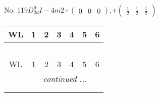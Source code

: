 \documentclass[fleqn,9pt,landscape]{jsarticle}
\begin{document}
\newpage
No. 119\quad$D_{2d}^{9}$\quad$I-4m2$\quad[ tetragonal ]\quad$+\begin{pmatrix} 0 & 0 & 0 \end{pmatrix}$,\quad $+\begin{pmatrix} \frac{1}{2} & \frac{1}{2} & \frac{1}{2} \end{pmatrix}$
\begin{center}
\renewcommand{\arraystretch}{1.2}
\begin{longtable}{ccccccc}
 \hline \hline
WL & 1 & 2 & 3 & 4 & 5 & 6 \\ \hline \endfirsthead

\multicolumn{6}{l}{\tablename\ \thetable{}} \\
 \hline \hline
WL & 1 & 2 & 3 & 4 & 5 & 6 \\ \hline \endhead

 \hline \hline
\multicolumn{6}{r}{\footnotesize\it continued ...} \\ \endfoot

 \hline \hline
\multicolumn{6}{r}{} \\ \endlastfoot


\end{longtable}
\end{center}
\end{document}
